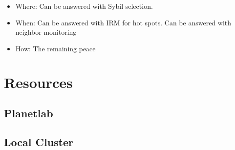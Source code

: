 \documentclass[10pt,letterpaper,twoside]{report}
\begin{document}
\begin{itemize}
    \item Where: Can be answered with Sybil selection.
    \item When:  Can be answered with IRM for hot spots.  Can be answered with neighbor monitoring
    \item How:  The remaining peace
\end{itemize}
\section{Resources}
\subsection{Planetlab}
\subsection{Local Cluster}





\end{document}
